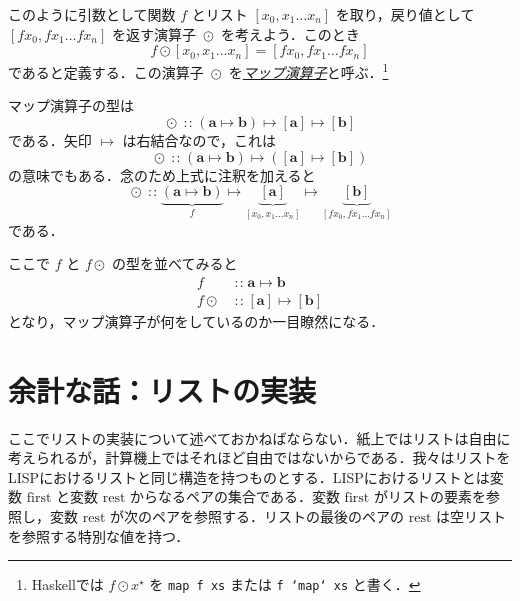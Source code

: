 \documentclass[a4paper]{jsbook}
\newcommand{\programminglanguage}[1]{\textsf{#1}}
\newcommand{\haskell}{\programminglanguage{Haskell}}
\newcommand{\lisp}{\programminglanguage{LISP}}
\newcommand{\keyword}[1]{{\underline{\emph{#1}}}}
\newcommand{\code}[1]{\texttt{#1}}
\newcommand{\mSpecialVar}[1]{\mathrm{#1}} %
\newcommand{\mFirstVar}{\mSpecialVar{first}}
\newcommand{\mRestVar}{\mSpecialVar{rest}}
\newcommand{\mType}[1]{\mathbf{#1}}
\newcommand{\mListType}[1]{[\mType{#1}]}
\newcommand{\mListWith}[1]{\left[#1\right]}
\newcommand{\mList}[1]{{#1}^\mathrm{\star}}
\DeclareMathOperator{\mIn}{{:\!:}}
\DeclareMathOperator{\mMapsTo}{\mapsto}
\DeclareMathOperator{\mMapList}{\odot}
\newcommand{\mProjection}[2]{#1\mMapsTo#2}
\newcommand{\mathVarKeyword}[1]{\operatorname{\mathrm{#1}}}
\newcommand{\mFirstVar}{\mathVarKeyword{first}}
\begin{document}
このように引数として関数 $f$ とリスト $\mListWith{x_0,x_1\dots x_n}$ を取り，戻り値として $\mListWith{fx_0,fx_1\dots fx_n}$ を返す演算子 $\mMapList$ を考えよう．このとき
\begin{equation}
f\mMapList\mListWith{x_0,x_1\dots x_n}
=\mListWith{fx_0,fx_1\dots fx_n}
\end{equation}
であると定義する．この演算子 $\mMapList$ を\keyword{マップ演算子}と呼ぶ．\footnote{\haskell では $f\mMapList\mList{x}$ を \code{map f xs} または \code{f `map` xs} と書く．}

マップ演算子の型は
\begin{equation}
\mMapList
\mIn{}
\mProjection{
  (\mProjection{\mType{a}}{\mType{b}})
}
{
  \mProjection{\mListType{a}}{\mListType{b}}
}
\end{equation}
である．矢印 $\mMapsTo$ は右結合なので，これは
\begin{equation}
\mMapList
\mIn{}
\mProjection{
  (\mProjection{\mType{a}}{\mType{b}})
}
{
  (\mProjection{\mListType{a}}{\mListType{b}})
}
\end{equation}
の意味でもある．念のため上式に注釈を加えると
\begin{equation}
\mMapList\mIn
\underbrace{\left(\mType{a}\mMapsTo\mType{b}\right)}_f
\mMapsTo
\underbrace{\mListType{a}}_{\mListWith{x_0,x_1\dots x_n}}
\mMapsTo
\underbrace{\mListType{b}}_{\mListWith{fx_0,fx_1\dots fx_n}}
\end{equation}
である．

ここで $f$ と $f\mMapList$ の型を並べてみると
\begin{align}
f&\mIn\mProjection{\mType{a}}{\mType{b}}\\
f\mMapList&\mIn\mProjection{\mListType{a}}{\mListType{b}}
\end{align}
となり，マップ演算子が何をしているのか一目瞭然になる．

\section{余計な話：リストの実装}

ここでリストの実装について述べておかねばならない．紙上ではリストは自由に考えられるが，計算機上ではそれほど自由ではないからである．我々はリストを\lisp におけるリストと同じ構造を持つものとする．\lisp におけるリストとは変数 $\mFirstVar$ と変数 $\mRestVar$ からなるペアの集合である．変数 $\mFirstVar$ がリストの要素を参照し，変数 $\mRestVar$ が次のペアを参照する．リストの最後のペアの $\mRestVar$ は空リストを参照する特別な値を持つ．
\end{document}
